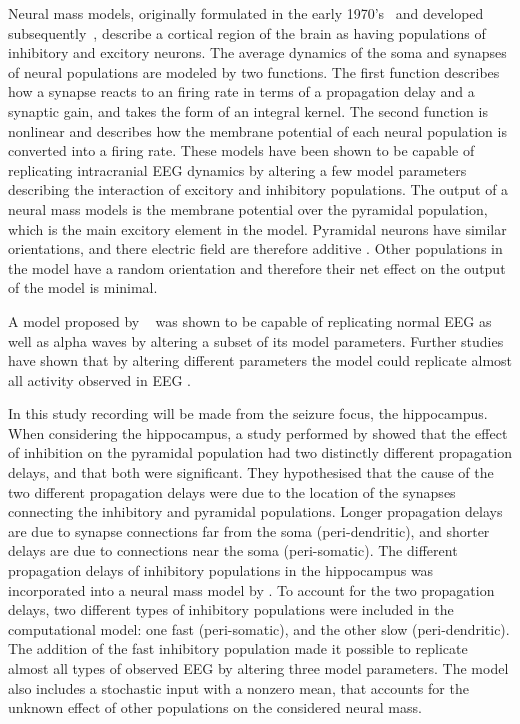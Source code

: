 
Neural mass models, originally formulated in the early 1970's~\citep{wilson1973mathematical,lopes1974model,freeman1963electrical} and developed subsequently~\citep{jansen1995electroencephalogram,wendling2002epileptic}, describe a cortical region of the brain as having populations of inhibitory and excitory neurons. The average dynamics of the soma and synapses of neural populations are modeled by two functions. The first function describes how a synapse reacts to an firing rate in terms of a propagation delay and a synaptic gain, and takes the form of an integral kernel. The second function is nonlinear and describes how the membrane potential of each neural population is converted into a firing rate. These models have been shown to be capable of replicating intracranial EEG dynamics by altering a few model parameters describing the interaction of excitory and inhibitory populations. The output of a neural mass models is the membrane potential over the pyramidal population, which is the main excitory element in the model. Pyramidal neurons have similar orientations, and there electric field are therefore additive . Other populations in the model have a random orientation and therefore their net effect on the output of the model is minimal.

A model proposed by ~\cite{jansen1995electroencephalogram} was shown to be capable of replicating normal EEG as well as alpha waves by altering a subset of its model parameters. Further studies have shown that by altering different parameters the model could replicate almost all activity observed in EEG . 

In this study recording will be made from the seizure focus, the hippocampus. When considering the hippocampus, a study performed by \cite{white2000networks} showed that the effect of inhibition on the pyramidal population had two distinctly different propagation delays, and that both were significant. They hypothesised that the cause of the two different propagation delays were due to the location of the synapses connecting the inhibitory and pyramidal populations. Longer propagation delays are due to synapse connections far from the soma (peri-dendritic), and shorter delays are due to connections near the soma (peri-somatic). The different propagation delays of inhibitory populations in the hippocampus was incorporated into a neural mass model by \cite{wendling2002epileptic}. To account for the two propagation delays, two different types of inhibitory populations were included in the computational model: one fast (peri-somatic), and the other slow (peri-dendritic). The addition of the fast inhibitory population made it possible to replicate almost all types of observed EEG by altering three model parameters. The model also includes a stochastic input with a nonzero mean, that accounts for the unknown effect of other populations on the considered neural mass.  

